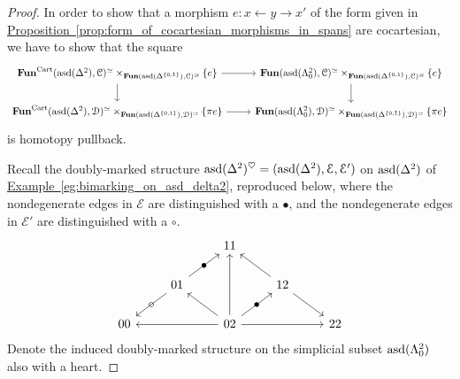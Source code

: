 \documentclass[main.tex]{subfiles}
\begin{document}
\begin{proof}
  In order to show that a morphism $e\colon x \leftarrow y \rightarrow x'$ of the form given in \hyperref[prop:form_of_cocartesian_morphisms_in_spans]{Proposition~\ref*{prop:form_of_cocartesian_morphisms_in_spans}} are cocartesian, we have to show that
  the square
  \begin{equation*}
    \begin{tikzcd}
      \Fun^{\Cart}(\asd(\Delta^{2}), \category{C})^{\simeq} \times_{\Fun(\asd(\Delta^{\{0, 1\}}), \category{C})^{\simeq}} \{e\}
      \arrow[r]
      \arrow[d]
      & \Fun(\asd(\Lambda^{2}_{0}), \category{C})^{\simeq} \times_{\Fun(\asd(\Delta^{\{0, 1\}}), \category{C})^{\simeq}} \{e\}
      \arrow[d]
      \\
      \Fun^{\Cart}(\asd(\Delta^{2}), \category{D})^{\simeq} \times_{\Fun(\asd(\Delta^{\{0, 1\}}), \category{D})^{\simeq}} \{\pi e\}
      \arrow[r]
      & \Fun(\asd(\Lambda^{2}_{0}), \category{D})^{\simeq} \times_{\Fun(\asd(\Delta^{\{0, 1\}}), \category{D})^{\simeq}} \{\pi e\}
    \end{tikzcd}
  \end{equation*}
  is homotopy pullback.

  Recall the doubly-marked structure $\mathrm{asd}(\Delta^{2})^{\heartsuit} = (\mathrm{asd}(\Delta^{2}), \mathcal{E}, \mathcal{E}')$ on $\mathrm{asd}(\Delta^{2})$ of \hyperref[eg:bimarking_on_asd_delta2]{Example~\ref*{eg:bimarking_on_asd_delta2}}, reproduced below, where the nondegenerate edges in $\mathcal{E}$ are distinguished with a $\bullet$, and the nondegenerate edges in $\mathcal{E}'$ are distinguished with a $\circ$.
  \begin{equation*}
    \begin{tikzcd}
      && 11
      \\
      & 01
      \arrow[ur, "\bullet" marking]
      \arrow[dl, "\circ" marking]
      && 12
      \arrow[ul]
      \arrow[dr]
      \\
      00
      && 02
      \arrow[ll]
      \arrow[rr]
      \arrow[uu]
      \arrow[ur, "\bullet" marking]
      \arrow[ul]
      && 22
    \end{tikzcd}
  \end{equation*}
  Denote the induced doubly-marked structure on the simplicial subset $\mathrm{asd}(\Lambda^{2}_{0})$ also with a heart.


\end{proof}
\end{document}
